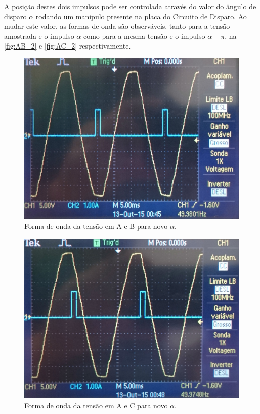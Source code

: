 \documentclass[a4paper,11pt]{article}
\numberwithin{equation}{section}
\begin{document}
A posição destes dois impulsos pode ser controlada através do valor do ângulo de disparo $\alpha$ rodando um manipulo presente na placa do Circuito de Disparo. Ao mudar este valor, as formas de onda são observáveis, tanto para a tensão amostrada e o impulso $\alpha$ como para a mesma tensão e o impulso  $\alpha + \pi$, na \autoref{fig:AB_2} e \autoref{fig:AC_2} respectivamente.

\begin{figure}[h]
	\centering
	\includegraphics[keepaspectratio=true, scale=0.11]{img/figs/AB_2}
	\caption{Forma de onda da tensão em A e B para novo $\alpha$.}
	\label{fig:AB_2}
	\vspace{-0.8em}
\end{figure}

\begin{figure}[h]
	\centering
	\includegraphics[keepaspectratio=true, scale=0.11]{img/figs/AC_2}
	\caption{Forma de onda da tensão em A e C para novo $\alpha$.}
	\label{fig:AC_2}
	\vspace{-0.8em}
\end{figure}
\end{document}
